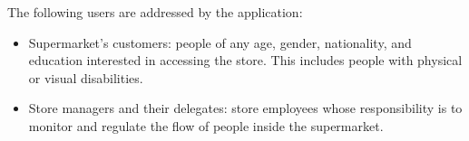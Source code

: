 \documentclass[../../main.tex]{subfiles}
\begin{document}
	The following users are addressed by the application:
	\begin{itemize}
		\item Supermarket's customers: people of any age, gender, nationality, and education interested in accessing the store. This includes people with physical or visual disabilities.
		\item Store managers and their delegates: store employees whose responsibility is to monitor and regulate the flow of people inside the supermarket.
	\end{itemize}
\end{document}
